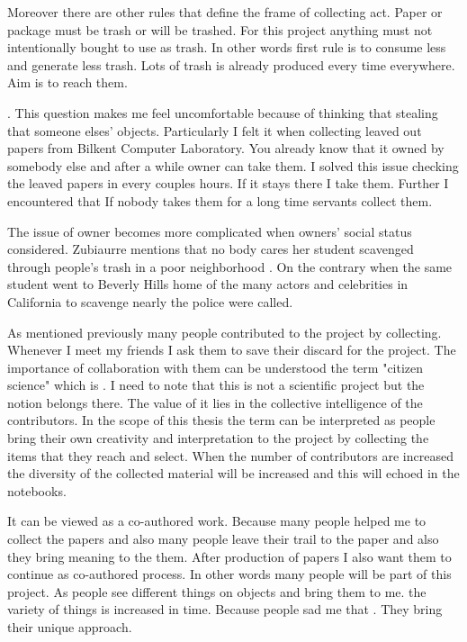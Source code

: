 Moreover there are other rules that define the frame of collecting act. Paper or package must be trash or will be trashed. For this project anything must not intentionally bought to use as trash. In other words first rule is to consume less and generate less trash. Lots of trash is already produced every time everywhere. Aim is to reach them.

 \citep{zimring2012encyclopedia}. This question makes me feel uncomfortable because of thinking that stealing that someone elses' objects. Particularly I felt it when collecting leaved out papers from Bilkent Computer Laboratory. You already know that it owned by somebody else and after a while owner can take them. I solved this issue checking the leaved papers in every couples hours. If it stays there I take them. Further I encountered that If nobody takes them for a long time servants collect them.

The issue of owner becomes more complicated when owners' social status considered. Zubiaurre mentions that no body cares her student scavenged through people’s trash in a poor neighborhood \citep[as cited in][]{pricano2011trashtalk}. On the contrary when the same student went to Beverly Hills home of the many actors and celebrities in California to scavenge nearly the police were called.

As mentioned previously many people contributed to the project by collecting. Whenever I meet my friends I ask them to save their discard for the project. The importance of collaboration with them can be understood the term "citizen science" which is  \citep{robson2012using}. I need to note that this is not a scientific project but the notion belongs there. The value of it lies in the collective intelligence of the contributors. In the scope of this thesis the term can be interpreted as people bring their own creativity and interpretation to the project by collecting the items that they reach and select. When the number of contributors are increased the diversity of the collected material will be increased and this will echoed in the notebooks. 

It can be viewed as a co-authored work. Because many people helped me to collect the papers and also many people leave their trail to the paper and also they bring meaning to the them. After production of papers I also want them to continue as co-authored process. In other words many people will be part of this project. As people see different things on objects and bring them to me. the variety of things is increased in time. Because people sad me that . They bring their unique approach. 

